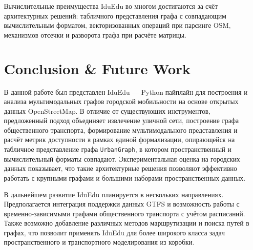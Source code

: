 \documentclass[sigconf,nonacm]{acmart}
\begin{document}
    Вычислительные преимущества IduEdu во многом достигаются за счёт архитектурных решений: табличного представления
    графа с совпадающим вычислительным форматом, векторизованных операций при парсинге OSM, механизмов отсечки и разворота графа при расчёте матрицы.

    \section{Conclusion \& Future Work}
    \label{sec:conclusion-&-future-work}

    В данной работе был представлен IduEdu — Python-пайплайн для построения и анализа мультимодальных графов городской
    мобильности на основе открытых данных OpenStreetMap.
    В отличие от существующих инструментов, предложенный подход объединяет извлечение уличной сети, построение графа общественного транспорта,
    формирование мультимодального представления и расчёт метрик доступности в рамках единой формализации, опирающейся на табличное
    представление графа \texttt{UrbanGraph}, в котором пространственный и вычислительный форматы совпадают.
    Экспериментальная оценка на городских данных показывает, что такие архитектурные решения позволяют эффективно работать
    с крупными графами и большими наборами пространственных данных.

    В дальнейшем развитие IduEdu планируется в нескольких направлениях.
    Предполагается интеграция поддержки данных GTFS и возможность работы с временно-зависимыми графами общественного транспорта с учётом расписаний.
    Также возможно добавление различных методов маршрутизации и поиска путей в графах, что позволит применять IduEdu
    для более широкого класса задач пространственного и транспортного моделирования из коробки.




    
    
\end{document}
